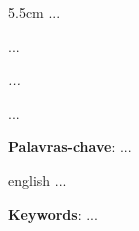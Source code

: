 \begin{dedicatoria}
	\vspace*{\fill}
	\noindent
	\begin{adjustwidth*}{}{5.5cm}
		\raggedleft
		...
	\end{adjustwidth*}
\end{dedicatoria}

\begin{agradecimentos}
    ...
\end{agradecimentos}

\begin{epigrafe}
	\vspace*{\fill}
	\begin{flushright}
		\textit{...}
	\end{flushright}
\end{epigrafe}

\setlength{\absparsep}{18pt}
\begin{resumo}
	\SingleSpacing
    ...
	
	\textbf{Palavras-chave}: ...
\end{resumo}

\begin{resumo}[Abstract]
	\SingleSpacing
	\begin{otherlanguage*}{english}
        ...

		\textbf{Keywords}: ...
	\end{otherlanguage*}
\end{resumo}

{
	\hypersetup{hidelinks}
	\listoffigures*
	\cleardoublepage
	
	\listofquadros*
	\cleardoublepage
	
	\listoftables*
	\cleardoublepage
	
	\imprimirlistadesiglas
	
	\imprimirlistadesimbolos
	
	\tableofcontents*
	\cleardoublepage
}
